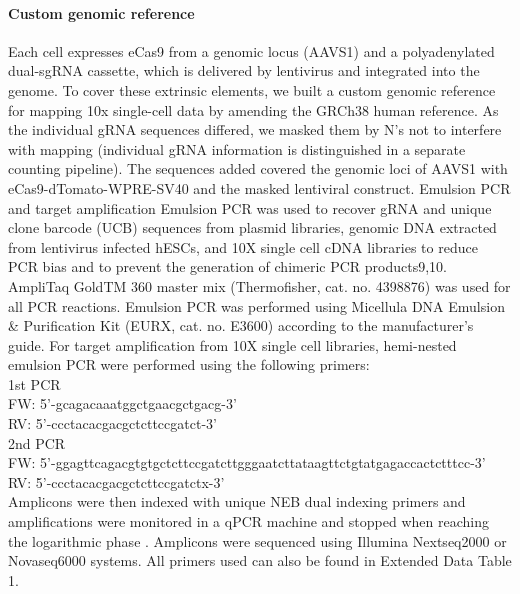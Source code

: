 \paragraph{Custom genomic reference}
Each cell expresses eCas9 from a genomic locus (AAVS1) and a polyadenylated dual-sgRNA cassette, which is delivered by lentivirus and integrated into the genome. To cover these extrinsic elements, we built a custom genomic reference for mapping 10x single-cell data by amending the GRCh38 human reference. As the individual gRNA sequences differed, we masked them by N's not to interfere with mapping (individual gRNA information is distinguished in a separate counting pipeline). The sequences added covered the genomic loci of AAVS1 with eCas9-dTomato-WPRE-SV40 and the masked lentiviral construct.
Emulsion PCR and target amplification
Emulsion PCR was used to recover gRNA and unique clone barcode (UCB) sequences from plasmid libraries, genomic DNA extracted from lentivirus infected hESCs, and 10X single cell cDNA libraries to reduce PCR bias and to prevent the generation of chimeric PCR products9,10. AmpliTaq GoldTM 360 master mix (Thermofisher, cat. no. 4398876) was used for all PCR reactions. Emulsion PCR was performed using Micellula DNA Emulsion \& Purification Kit (EURX, cat. no. E3600) according to the manufacturer's guide. For target amplification from 10X single cell libraries, hemi-nested emulsion PCR were performed using the following primers: \\
1st PCR \\
FW: 5'-gcagacaaatggctgaacgctgacg-3' \\
RV: 5'-ccctacacgacgctcttccgatct-3' \\
2nd PCR \\
FW: 5'-ggagttcagacgtgtgctcttccgatcttgggaatcttataagttctgtatgagaccactctttcc-3' \\
RV: 5'-ccctacacgacgctcttccgatctx-3' \\
Amplicons were then indexed with unique NEB dual indexing primers and amplifications were monitored in a qPCR machine and stopped when reaching the logarithmic phase . Amplicons were sequenced using Illumina Nextseq2000 or Novaseq6000 systems. All primers used can also be found in Extended Data Table 1. 

